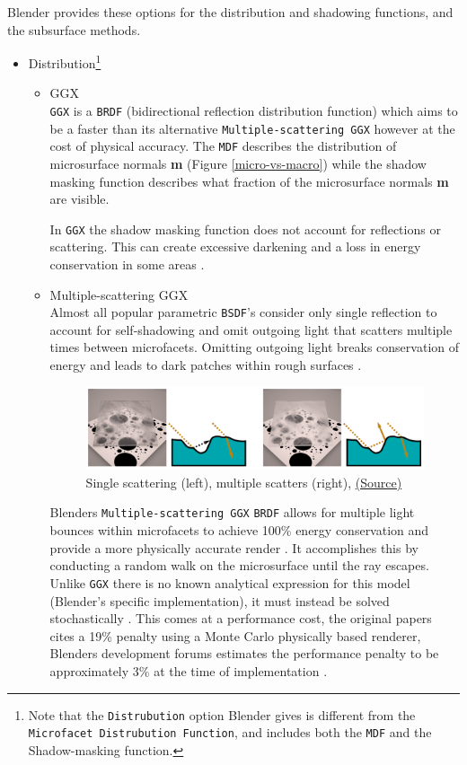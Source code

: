 \documentclass[11pt]{article}
\begin{document}
Blender provides these options for the distribution and shadowing functions, and
the subsurface methods.
\begin{itemize}
\item Distribution\footnote{Note that the \texttt{Distrubution} option Blender gives is different from the
\texttt{Microfacet Distrubution Function}, and includes both the \texttt{MDF} and the
Shadow-masking function.}
\begin{itemize}
\item GGX \\
\texttt{GGX} is a \texttt{BRDF} (bidirectional reflection distribution function) which
aims to be a faster than its alternative \texttt{Multiple-scattering GGX} however
at the cost  of physical accuracy.
The \texttt{MDF} describes the distribution of microsurface normals \textbf{m} (Figure
\ref{micro-vs-macro}) while the shadow masking function describes what fraction of
the microsurface normals \textbf{m} are visible. \cite{ggx-paper}

In \texttt{GGX} the shadow masking function does not account for reflections or
scattering. This can create excessive darkening and a loss in energy
conservation in some areas \cite{principled-bsdf-docs}.

\item Multiple-scattering GGX \\
Almost all popular parametric \texttt{BSDF}'s consider only single reflection
to account for self-shadowing and omit outgoing light that scatters
multiple times between microfacets. Omitting outgoing light  breaks
conservation of energy and leads to dark patches within rough surfaces
\cite{ms-ggx-paper}.
\begin{figure}[htbp]
\centering
\includegraphics[width=.9\linewidth]{Images/multiplescatteringsmith_teaser.png}
\caption{Single scattering (left), multiple scatters (right), \href{https://eheitzresearch.files.wordpress.com/2015/10/multiplescatteringsmith\_teaser.png}{(Source)}}
\end{figure}

Blenders \texttt{Multiple-scattering GGX} \texttt{BRDF} allows for multiple light bounces
within microfacets to achieve 100\% energy conservation and provide a more
physically accurate render \cite{principled-bsdf-docs,ms-ggx-paper} . It
accomplishes this by conducting a random walk on the microsurface until the
ray escapes. Unlike \texttt{GGX} there is no known analytical expression for this
model (Blender's specific implementation), it must instead be solved
stochastically \cite{blender-issue-tracker}.
This comes at a performance cost, the original papers cites a 19\% penalty
using a Monte Carlo physically based renderer, Blenders development forums
estimates the performance penalty to be approximately 3\% at the time of
implementation \cite{blender-issue-tracker}.
\end{itemize}


\end{itemize}
\end{document}

